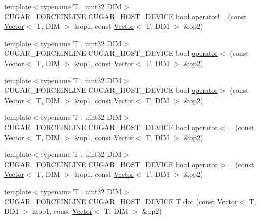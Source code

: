 \begin{DoxyCompactItemize}
\item 
{\footnotesize template$<$typename T , uint32 D\+IM$>$ }\\C\+U\+G\+A\+R\+\_\+\+F\+O\+R\+C\+E\+I\+N\+L\+I\+NE C\+U\+G\+A\+R\+\_\+\+H\+O\+S\+T\+\_\+\+D\+E\+V\+I\+CE bool \hyperlink{group___vectors_module_ga7d5781e9d1c69c0520c733fd15a64c32}{operator!=} (const \hyperlink{structcugar_1_1_vector}{Vector}$<$ T, D\+IM $>$ \&op1, const \hyperlink{structcugar_1_1_vector}{Vector}$<$ T, D\+IM $>$ \&op2)
\item 
{\footnotesize template$<$typename T , uint32 D\+IM$>$ }\\C\+U\+G\+A\+R\+\_\+\+F\+O\+R\+C\+E\+I\+N\+L\+I\+NE C\+U\+G\+A\+R\+\_\+\+H\+O\+S\+T\+\_\+\+D\+E\+V\+I\+CE bool \hyperlink{group___vectors_module_ga2f4af808d98e230aa470de34594eb210}{operator$<$} (const \hyperlink{structcugar_1_1_vector}{Vector}$<$ T, D\+IM $>$ \&op1, const \hyperlink{structcugar_1_1_vector}{Vector}$<$ T, D\+IM $>$ \&op2)
\item 
{\footnotesize template$<$typename T , uint32 D\+IM$>$ }\\C\+U\+G\+A\+R\+\_\+\+F\+O\+R\+C\+E\+I\+N\+L\+I\+NE C\+U\+G\+A\+R\+\_\+\+H\+O\+S\+T\+\_\+\+D\+E\+V\+I\+CE bool \hyperlink{group___vectors_module_ga22458d0373234955592695abc8d9d6f0}{operator$>$} (const \hyperlink{structcugar_1_1_vector}{Vector}$<$ T, D\+IM $>$ \&op1, const \hyperlink{structcugar_1_1_vector}{Vector}$<$ T, D\+IM $>$ \&op2)
\item 
{\footnotesize template$<$typename T , uint32 D\+IM$>$ }\\C\+U\+G\+A\+R\+\_\+\+F\+O\+R\+C\+E\+I\+N\+L\+I\+NE C\+U\+G\+A\+R\+\_\+\+H\+O\+S\+T\+\_\+\+D\+E\+V\+I\+CE bool \hyperlink{group___vectors_module_ga17776186977d2759c2ee3ea8f9ddce77}{operator$<$=} (const \hyperlink{structcugar_1_1_vector}{Vector}$<$ T, D\+IM $>$ \&op1, const \hyperlink{structcugar_1_1_vector}{Vector}$<$ T, D\+IM $>$ \&op2)
\item 
{\footnotesize template$<$typename T , uint32 D\+IM$>$ }\\C\+U\+G\+A\+R\+\_\+\+F\+O\+R\+C\+E\+I\+N\+L\+I\+NE C\+U\+G\+A\+R\+\_\+\+H\+O\+S\+T\+\_\+\+D\+E\+V\+I\+CE bool \hyperlink{group___vectors_module_ga5f00020bbec9b8d69dd1218a4ff7e78c}{operator$>$=} (const \hyperlink{structcugar_1_1_vector}{Vector}$<$ T, D\+IM $>$ \&op1, const \hyperlink{structcugar_1_1_vector}{Vector}$<$ T, D\+IM $>$ \&op2)
\item 
{\footnotesize template$<$typename T , uint32 D\+IM$>$ }\\C\+U\+G\+A\+R\+\_\+\+F\+O\+R\+C\+E\+I\+N\+L\+I\+NE C\+U\+G\+A\+R\+\_\+\+H\+O\+S\+T\+\_\+\+D\+E\+V\+I\+CE T \hyperlink{group___vectors_module_gab7854923b97b44405c7335f0df540fd3}{dot} (const \hyperlink{structcugar_1_1_vector}{Vector}$<$ T, D\+IM $>$ \&op1, const \hyperlink{structcugar_1_1_vector}{Vector}$<$ T, D\+IM $>$ \&op2)

\end{DoxyCompactItemize}

